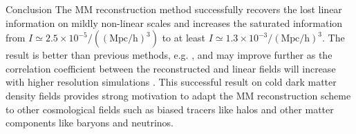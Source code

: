 \begin{section}{Conclusion}
  \label{sec:conclusion}
  The MM reconstruction method successfully recovers the lost linear
  information on mildly non-linear scales and increases the saturated
  information from $I \simeq 2.5 \times 10^{-5}/(\mathrm{(Mpc/h)}^3)$
  to at least $I \simeq 1.3 \times 10^{-3}/\mathrm{(Mpc/h)}^3$.  The result is
  better than previous methods,
  e.g. \cite{bib:Mark2006,bib:Mark2009,bib:Zhang2011,bib:Yu2012}, and
  may improve further as the correlation coefficient between the
  reconstructed and linear fields will increase with higher resolution
  simulations \cite{bib:ZhuH2016}.  This successful result on cold
  dark matter density fields provides strong motivation to adapt the
  MM reconstruction scheme to other cosmological fields such as biased
  tracers like halos and other matter components like baryons and
  neutrinos.



\end{section}

